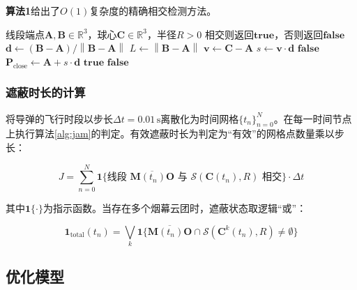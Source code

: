 \documentclass[12pt,a4paper]{ctexart}
\newcommand{\norm}[1]{\left\| #1 \right\|}
\newcommand{\vect}[1]{\boldsymbol{#1}}
\newcommand{\R}{\mathbb{R}}
\begin{document}
\textbf{算法1}给出了$O(1)$复杂度的精确相交检测方法。

\begin{algorithm}[H]
\caption{线段--球相交检测 (LineSegment-Sphere-Intersection)}
\label{alg:jam}
\begin{algorithmic}[1]
\Require 线段端点$\vect{A}, \vect{B} \in \R^3$，球心$\vect{C} \in \R^3$，半径$R>0$
\Ensure 相交则返回$\mathbf{true}$，否则返回$\mathbf{false}$
\State $\vect{d} \gets (\vect{B} - \vect{A}) / \norm{\vect{B} - \vect{A}}$ 
\State $L \gets \norm{\vect{B} - \vect{A}}$ 
\State $\vect{v} \gets \vect{C} - \vect{A}$
\State $s \gets \vect{v} \cdot \vect{d}$ 
    \State \Return $\mathbf{false}$ 
\EndIf
\State $\vect{P}_{\text{close}} \gets \vect{A} + s \cdot \vect{d}$ 
\If{$\norm{\vect{P}_{\text{close}} - \vect{C}} \leq R$}
    \State \Return $\mathbf{true}$
\Else
    \State \Return $\mathbf{false}$
\EndIf
\end{algorithmic}
\end{algorithm}

\subsubsection{遮蔽时长的计算}

将导弹的飞行时段以步长$\Delta t = 0.01\,\text{s}$离散化为时间网格$\{t_n\}_{n=0}^{N}$。在每一时间节点上执行算法\ref{alg:jam}的判定。有效遮蔽时长为判定为“有效”的网格点数量乘以步长：

\begin{equation}\label{eq:jam_time}
J = \sum_{n=0}^{N} \mathbf{1}\{\text{线段 }\overline{\vect{M}(t_n)\vect{O}}\text{ 与 } \mathcal{S}(\vect{C}(t_n), R)\text{ 相交}\} \cdot \Delta t
\end{equation}

其中$\mathbf{1}\{\cdot\}$为指示函数。当存在多个烟幕云团时，遮蔽状态取逻辑“或”：

\begin{equation}\label{eq:multi_jam}
\mathbf{1}_{\text{total}}(t_n) = \bigvee_{k} \mathbf{1}\{\overline{\vect{M}(t_n)\vect{O}} \cap \mathcal{S}(\vect{C}^k(t_n), R) \neq \emptyset\}
\end{equation}

\subsection{优化模型}
\end{document}
